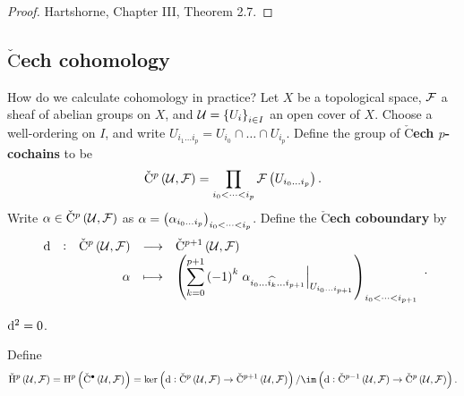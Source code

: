 \begin{proof}
Hartshorne, Chapter III, Theorem 2.7.
\end{proof}

\pagebreak

\subsection{\texorpdfstring{$\check{\text{C}}$ech}{Cech} cohomology}

How do we calculate cohomology in practice? Let $ X $ be a topological space, $ \mathcal{F} $ a sheaf of abelian groups on $ X $, and $ \UUU = \cbr{U_i}_{i \in I} $ an open cover of $ X $. Choose a well-ordering on $ I $, and write $ U_{i_1 \dots i_p} = U_{i_0} \cap \dots \cap U_{i_p} $. Define the group of \textbf{$\check{\text{C}}$ech $ p $-cochains} to be
$$ \vC^p\br{\UUU, \FFF} = \prod_{i_0 < \dots < i_p} \FFF\br{U_{i_0 \dots i_p}}. $$
Write $ \alpha \in \vC^p\br{\UUU, \FFF} $ as $ \alpha = \br{\alpha_{i_0 \dots i_p}}_{i_0 < \dots < i_p} $. Define the \textbf{$\check{\text{C}}$ech coboundary} by
$$ \function[\d]{\vC^p\br{\UUU, \FFF}}{\vC^{p + 1}\br{\UUU, \FFF}}{\alpha}{\br{\sum_{k = 0}^{p + 1} \br{-1}^k\eval{\alpha_{i_0 \dots \widehat{i_k} \dots i_{p + 1}}}_{U_{i_0 \dots i_{p + 1}}}}_{i_0 < \dots < i_{p + 1}}}. $$

\begin{exercise*}
$ \mathrm{d}^2 = 0 $.
\end{exercise*}

Define
$$ \vH^p\br{\UUU, \FFF} = \H^p\br{\vC^\bullet\br{\UUU, \FFF}} = \ker \br{\d : \vC^p\br{\UUU, \FFF} \to \vC^{p + 1}\br{\UUU, \FFF}} / \im \br{\d : \vC^{p - 1}\br{\UUU, \FFF} \to \vC^p\br{\UUU, \FFF}}. $$

